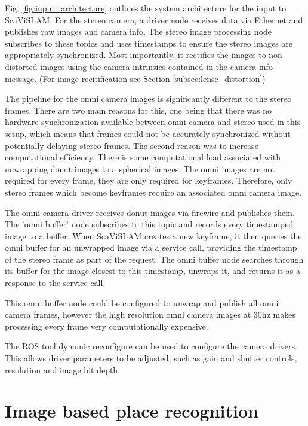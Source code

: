 Fig. \ref{fig:input_architecture} outlines the system architecture for the input to ScaViSLAM.  For the stereo camera, a driver node receives data via Ethernet and publishes raw images and camera info.  The stereo image processing node subscribes to these topics and uses timestamps to ensure the stereo images are appropriately synchronized.  Most importantly, it rectifies the images to non distorted images using the camera intrinsics contained in the camera info message. (For image recitification see Section \ref{subsec:lense_distortion}) 

The pipeline for the omni camera images is significantly different to the stereo frames.  There are two main reasons for this, one being that there was no hardware synchronization available between omni camera and stereo used in this setup, which means that frames could not be accurately synchronized without potentially delaying stereo frames.  The second reason was to increase computational efficiency.  There is some computational load associated with unwrapping donut images to a spherical images.  The omni images are not required for every frame, they are only required for keyframes.  Therefore, only stereo frames which become keyframes require an associated omni camera image.

The omni camera driver receives donut images via firewire and publishes them.  The 'omni buffer' node subscribes to this topic and records every timestamped image to a buffer.  When ScaViSLAM creates a new keyframe, it then queries the omni buffer for an unwrapped image via a service call, providing the timestamp of the stereo frame as part of the request.  The omni buffer node searches through its buffer for the image closest to this timestamp, unwraps it, and returns it as a response to the service call.

This omni buffer node could be configured to unwrap and publish all omni camera frames, however the high resolution omni camera images at 30hz makes processing every frame very computationally expensive.

The ROS tool dynamic reconfigure can be used to configure the camera drivers.  This allows driver parameters to be adjusted, such as gain and shutter controls, resolution and image bit depth.

\section{Image based place recognition}

